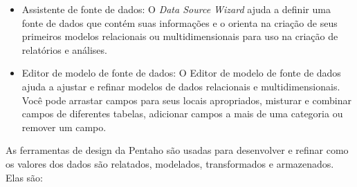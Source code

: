 \begin{itemize}
    \item Assistente de fonte de dados: O \textit{Data Source Wizard} ajuda a definir uma fonte de dados que cont\'{e}m suas informa\c{c}\~{o}es e o orienta na cria\c{c}\~{a}o de seus primeiros modelos relacionais ou multidimensionais para uso na cria\c{c}\~{a}o de relat\'orios e an\'{a}lises.
    
    \item Editor de modelo de fonte de dados: O Editor de modelo de fonte de dados ajuda a ajustar e refinar modelos de dados relacionais e multidimensionais. Você pode arrastar campos para seus locais apropriados, misturar e combinar campos de diferentes tabelas, adicionar campos a mais de uma categoria ou remover um campo.
\end{itemize}

As ferramentas de design da Pentaho s\~{a}o usadas para desenvolver e refinar como os valores dos dados s\~{a}o relatados, modelados, transformados e armazenados. Elas s\~{a}o:

